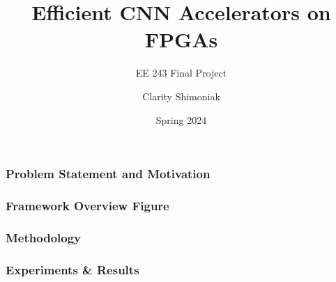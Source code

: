 \documentclass[english]{beamer}
\begin{document}
\title{Efficient CNN Accelerators on FPGAs}
\subtitle{EE 243 Final Project}
\author{Clarity Shimoniak}
\date{Spring 2024}
\frame{\titlepage}


\begin{frame}
\frametitle{Problem Statement and Motivation}
\end{frame}


\begin{frame}
\frametitle{Framework Overview Figure}
\end{frame}


\begin{frame}
\frametitle{Methodology}
\end{frame}


\begin{frame}
\frametitle{Experiments \& Results}
\end{frame}
\end{document}
